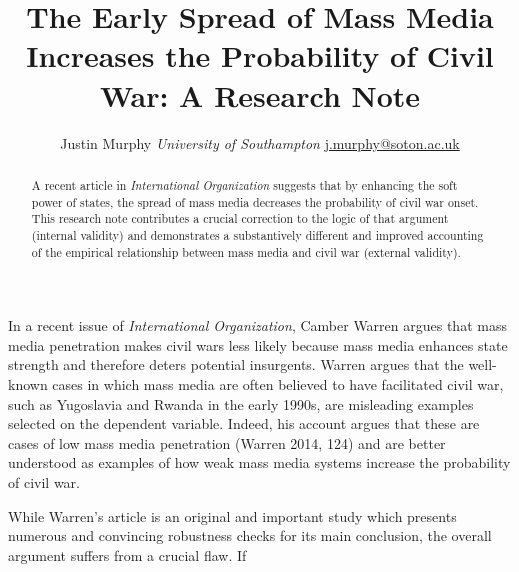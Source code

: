 \documentclass[11pt,article,oneside]{memoir}
\title{The Early Spread of Mass Media Increases the Probability of Civil War: A
Research Note}
\author{\Large Justin Murphy\vspace{0.05in} \newline\normalsize\emph{University of Southampton} \newline\footnotesize \url{j.murphy@soton.ac.uk}\vspace*{0.2in}\newline }
\date{}
\begin{document}
  
\setsansfont[Mapping=tex-text]{Gill Sans} 
\setmonofont[Mapping=tex-text,Scale=0.8]{Consolas}

\doublespacing


\maketitle



\vspace{-4ex}
\begin{abstract}

\noindent A recent article in \emph{International Organization} suggests that by
enhancing the soft power of states, the spread of mass media decreases
the probability of civil war onset. This research note contributes a
crucial correction to the logic of that argument (internal validity) and
demonstrates a substantively different and improved accounting of the
empirical relationship between mass media and civil war (external
validity).

\end{abstract}

\newpage


In a recent issue of \emph{International Organization}, Camber Warren
argues that mass media penetration makes civil wars less likely because
mass media enhances state strength and therefore deters potential
insurgents. Warren argues that the well-known cases in which mass media
are often believed to have facilitated civil war, such as Yugoslavia and
Rwanda in the early 1990s, are misleading examples selected on the
dependent variable. Indeed, his account argues that these are cases of
low mass media penetration (Warren 2014, 124) and are better understood
as examples of how weak mass media systems increase the probability of
civil war.

While Warren's article is an original and important study which presents
numerous and convincing robustness checks for its main conclusion, the
overall argument suffers from a crucial flaw. If
\end{document}
